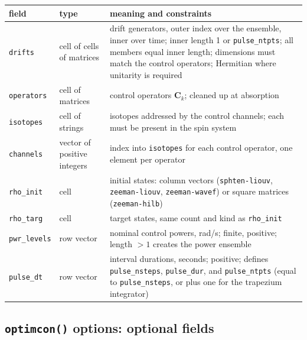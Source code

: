 \documentclass[11pt,a4paper]{article}
\newcommand{\code}[1]{\texttt{#1}}
\begin{document}
\begin{center}
\begin{tabular}{lp{4.2cm}p{7.2cm}}
\toprule
field & type & meaning and constraints\\
\midrule
\code{drifts} & cell of cells of matrices & drift generators, outer
index over the ensemble, inner over time; inner length 1 or
\code{pulse\_ntpts}; all members equal inner length; dimensions must
match the control operators; Hermitian where unitarity is required\\
\code{operators} & cell of matrices & control operators
$\mathbf{C}_k$; cleaned up at absorption\\
\code{isotopes} & cell of strings & isotopes addressed by the control
channels; each must be present in the spin system\\
\code{channels} & vector of positive integers & index into
\code{isotopes} for each control operator, one element per operator\\
\code{rho\_init} & cell & initial states: column vectors
(\code{sphten-liouv}, \code{zeeman-liouv}, \code{zeeman-wavef}) or
square matrices (\code{zeeman-hilb})\\
\code{rho\_targ} & cell & target states, same count and kind as
\code{rho\_init}\\
\code{pwr\_levels} & row vector & nominal control powers, rad/s;
finite, positive; length $>1$ creates the power ensemble\\
\code{pulse\_dt} & row vector & interval durations, seconds; positive;
defines \code{pulse\_nsteps}, \code{pulse\_dur}, and
\code{pulse\_ntpts} (equal to \code{pulse\_nsteps}, or plus one for
the trapezium integrator)\\
\bottomrule
\end{tabular}
\end{center}

\subsection{\code{optimcon()} options: optional fields}
\end{document}
